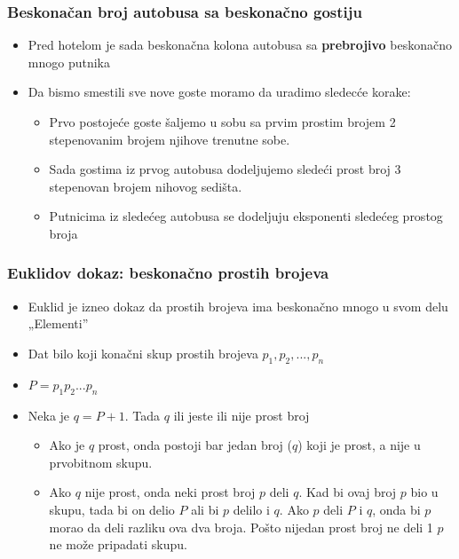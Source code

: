 \documentclass{beamer}
\begin{document}
\begin{frame}[fragile]\frametitle{Beskonačan broj autobusa sa beskonačno gostiju}
\begin{itemize}
    \item Pred hotelom je sada beskonačna kolona autobusa sa \textbf{prebrojivo} beskonačno mnogo putnika
    \item Da bismo smestili sve nove goste moramo da uradimo sledecće korake:
    \begin{itemize}
        \item Prvo postojeće goste šaljemo u sobu sa prvim prostim brojem 2 stepenovanim brojem njihove trenutne sobe.
        \item Sada gostima iz prvog autobusa dodeljujemo sledeći prost broj 3 stepenovan brojem nihovog sedišta.
        \item Putnicima iz sledećeg autobusa se dodeljuju eksponenti sledećeg prostog broja
    \end{itemize}
\end{itemize}
\end{frame}

\begin{frame}[fragile]\frametitle{Euklidov dokaz: beskonačno prostih brojeva}
\begin{itemize}
    \item Euklid je izneo dokaz da prostih brojeva ima beskonačno mnogo u svom delu „Elementi”
    \item Dat bilo koji konačni skup prostih brojeva $p_{1}, p_{2}, ..., p_{n}$
    \item $P = p_{1}p_{2}...p_{n}$
    \item Neka je $q = P + 1$. Tada $q$ ili jeste ili nije prost broj
    \begin{itemize}
        \item Ako je $q$ prost, onda postoji bar jedan broj ($q$) koji je prost, a nije u prvobitnom skupu.
        \item Ako $q$ nije prost, onda neki prost broj $p$ deli $q$. Kad bi ovaj broj $p$ bio u skupu, tada bi on delio $P$ ali bi $p$ delilo i $q$. Ako $p$ deli $P$ i $q$, onda bi $p$ morao da deli razliku ova dva broja. Pošto nijedan prost broj ne deli 1 $p$ ne može pripadati skupu.
    \end{itemize}
\end{itemize}
\end{frame}
\end{document}
